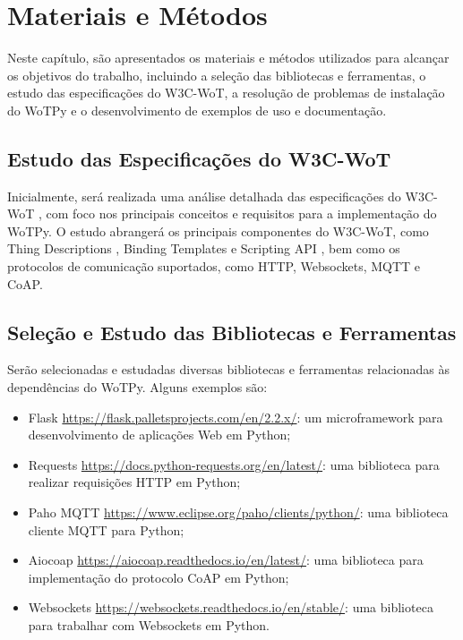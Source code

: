 \chapter{Materiais e Métodos}


Neste capítulo, são apresentados os materiais e métodos utilizados para alcançar os objetivos do trabalho, incluindo a seleção das bibliotecas e ferramentas, o estudo das especificações do W3C-WoT, a resolução de problemas de instalação do WoTPy e o desenvolvimento de exemplos de uso e documentação.

\section{Estudo das Especificações do W3C-WoT} \label{estudo}

Inicialmente, será realizada uma análise detalhada das especificações do W3C-WoT \cite{WoTArchitecture}, com foco nos principais conceitos e requisitos para a implementação do WoTPy. O estudo abrangerá os principais componentes do W3C-WoT, como Thing Descriptions \cite{McCool:23:WTT}, Binding Templates \cite{WoTBinding} e Scripting API \cite{WoTScripting}, bem como os protocolos de comunicação suportados, como HTTP, Websockets, MQTT e CoAP.

\section{Seleção e Estudo das Bibliotecas e Ferramentas} \label{dependência}

Serão selecionadas e estudadas diversas bibliotecas e ferramentas relacionadas às dependências do WoTPy. Alguns exemplos são:

\begin{itemize}
    \item Flask \url{https://flask.palletsprojects.com/en/2.2.x/}: um microframework para desenvolvimento de aplicações Web em Python;
    \item Requests \url{https://docs.python-requests.org/en/latest/}: uma biblioteca para realizar requisições HTTP em Python;
    \item Paho MQTT \url{https://www.eclipse.org/paho/clients/python/}: uma biblioteca cliente MQTT para Python;
    \item Aiocoap \url{https://aiocoap.readthedocs.io/en/latest/}: uma biblioteca para implementação do protocolo CoAP em Python;
    \item Websockets \url{https://websockets.readthedocs.io/en/stable/}: uma biblioteca para trabalhar com Websockets em Python.
\end{itemize}

